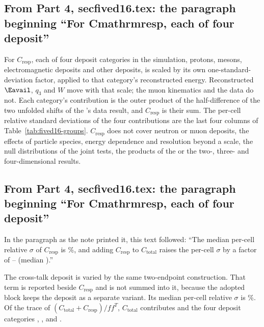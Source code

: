 \subsection{From Part 4, secfived16.tex: the paragraph beginning ``For Cmathrmresp, each of four deposit''}
For $C_{\mathrm{resp}}$, each of four deposit categories in the simulation, protons, mesons, electromagnetic deposits and other deposits, is scaled by its own one-standard-deviation factor, applied to that category's reconstructed energy. Reconstructed $\Eavail$, $q_3$ and $W$ move with that scale; the muon kinematics and the data do not. Each category's contribution is the outer product of the half-difference of the two unfolded shifts of the \estMultiD{}'s data result, and $C_{\mathrm{resp}}$ is their sum. The per-cell relative standard deviations of the four contributions are the last four columns of Table~\ref{tab:fived16-groups}. $C_{\mathrm{resp}}$ does not cover neutron or muon deposits, the effects of particle species, energy dependence and resolution beyond a scale, the null distributions of the joint tests, the products of the \estPurity{} or the two-, three- and four-dimensional results.

\subsection{From Part 4, secfived16.tex: the paragraph beginning ``For Cmathrmresp, each of four deposit''}
In the paragraph as the note printed it, this text followed: ``The median per-cell relative $\sigma$ of $C_{\mathrm{resp}}$ is \%, and adding $C_{\mathrm{resp}}$ to $C_{\mathrm{total}}$ raises the per-cell $\sigma$ by a factor of -- (median ).''\par
The cross-talk deposit is varied by the same two-endpoint construction. That term is reported beside $C_{\mathrm{resp}}$ and is not summed into it, because the adopted block keeps the deposit as a separate variant. Its median per-cell relative $\sigma$ is \%. Of the trace of $(C_{\mathrm{total}}+C_{\mathrm{resp}})/f f^{T}$, $C_{\mathrm{total}}$ contributes  and the four deposit categories , ,  and .

